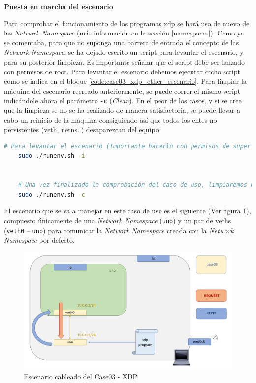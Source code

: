 \vspace{0.7cm}
\textbf{Puesta en marcha del escenario}\\
\par
Para comprobar el funcionamiento de los programas \gls{xdp} se hará uso de nuevo de las \textit{Network Namespace} (más información en la sección \ref{namespaces}). Como ya se comentaba, para que no suponga una barrera de entrada el concepto de las \textit{Network Namespace}, se ha dejado escrito un script para levantar el escenario, y para su posterior limpieza. Es importante señalar que el script debe ser lanzado con permisos de root. Para levantar el escenario debemos ejecutar dicho script como se indica en el bloque \ref{code:case03_xdp_ether_escenario}. Para limpiar la máquina del escenario recreado anteriormente, se puede correr el mismo script indicándole ahora el parámetro \texttt{-c} (\textit{Clean}). En el peor de los casos, y si se cree que la limpieza se no se ha realizado de manera satisfactoria, se puede llevar a cabo un reinicio de la máquina consiguiendo así que todos los entes no persistentes (\gls{veth}, netns..) desaparezcan del equipo.

\begin{lstlisting}[language= bash, style=Consola, caption={Puesta en marcha del escenario - Case03},label=code:case03_xdp_ether_escenario]
    # Para levantar el escenario (Importante hacerlo con permisos de super usuario)
    sudo ./runenv.sh -i
    
    
    # Una vez finalizado la comprobación del caso de uso, limpiaremos nuestra máquina:
    sudo ./runenv.sh -c
\end{lstlisting}
\vspace{0.5cm}

El escenario que se va a manejar en este caso de uso es el siguiente (Ver figura \ref{fig:case03_xdp_ether_scenario}), compuesto únicamente de una \textit{Network Namespace} (\texttt{uno}) y un par de \gls{veth}s (\texttt{veth0} -- \texttt{uno}) para comunicar la \textit{Network Namespace} creada con la \textit{Network Namespace} por defecto.

\begin{figure}[ht]
    \centering
    \includegraphics[width=16cm]{archivos/img/dev/xdp/case03/scenario.png}
    \caption{Escenario cableado del Case03 - XDP}
    \label{fig:case03_xdp_ether_scenario}
\end{figure}


